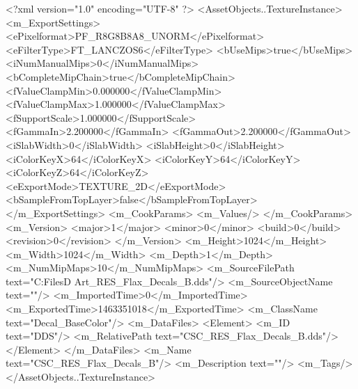 <?xml version="1.0" encoding="UTF-8" ?>
<AssetObjects..TextureInstance>
	<m_ExportSettings>
		<ePixelformat>PF_R8G8B8A8_UNORM</ePixelformat>
		<eFilterType>FT_LANCZOS6</eFilterType>
		<bUseMips>true</bUseMips>
		<iNumManualMips>0</iNumManualMips>
		<bCompleteMipChain>true</bCompleteMipChain>
		<fValueClampMin>0.000000</fValueClampMin>
		<fValueClampMax>1.000000</fValueClampMax>
		<fSupportScale>1.000000</fSupportScale>
		<fGammaIn>2.200000</fGammaIn>
		<fGammaOut>2.200000</fGammaOut>
		<iSlabWidth>0</iSlabWidth>
		<iSlabHeight>0</iSlabHeight>
		<iColorKeyX>64</iColorKeyX>
		<iColorKeyY>64</iColorKeyY>
		<iColorKeyZ>64</iColorKeyZ>
		<eExportMode>TEXTURE_2D</eExportMode>
		<bSampleFromTopLayer>false</bSampleFromTopLayer>
	</m_ExportSettings>
	<m_CookParams>
		<m_Values/>
	</m_CookParams>
	<m_Version>
		<major>1</major>
		<minor>0</minor>
		<build>0</build>
		<revision>0</revision>
	</m_Version>
	<m_Height>1024</m_Height>
	<m_Width>1024</m_Width>
	<m_Depth>1</m_Depth>
	<m_NumMipMaps>10</m_NumMipMaps>
	<m_SourceFilePath text="C:\Users\Shadow\Desktop\Working Files\3D Art\Resources\Flax\CSC_RES_Flax_Decals_B.dds"/>
	<m_SourceObjectName text=""/>
	<m_ImportedTime>0</m_ImportedTime>
	<m_ExportedTime>1463351018</m_ExportedTime>
	<m_ClassName text="Decal_BaseColor"/>
	<m_DataFiles>
		<Element>
			<m_ID text="DDS"/>
			<m_RelativePath text="CSC_RES_Flax_Decals_B.dds"/>
		</Element>
	</m_DataFiles>
	<m_Name text="CSC_RES_Flax_Decals_B"/>
	<m_Description text=""/>
	<m_Tags/>
</AssetObjects..TextureInstance>

